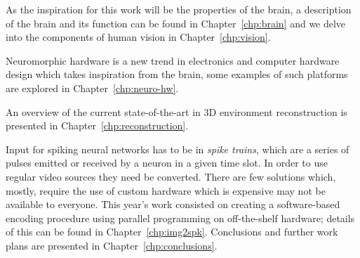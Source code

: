 As the inspiration for this work will be the properties of the brain, a description of the brain and its function can be found in Chapter~\ref{chp:brain} and we delve into the components of human vision in Chapter~\ref{chp:vision}.  

Neuromorphic hardware is a new trend in electronics and computer hardware design which takes inspiration from the brain, some examples of such platforms are explored in Chapter~\ref{chp:neuro-hw}.

An overview of the current state-of-the-art in 3D environment reconstruction is presented in Chapter~\ref{chp:reconstruction}.

Input for spiking neural networks has to be in \emph{spike trains}, which are a series of pulses emitted or received by a neuron in a given time slot. In order to use regular video sources they need be converted. There are few solutions which, mostly, require the use of custom hardware which is expensive may not be available to everyone. This year's work consisted on creating a software-based encoding procedure using parallel programming on off-the-shelf hardware; details of this can be found in Chapter~\ref{chp:img2spk}. 
Conclusions and further work plans are presented in Chapter~\ref{chp:conclusions}.

